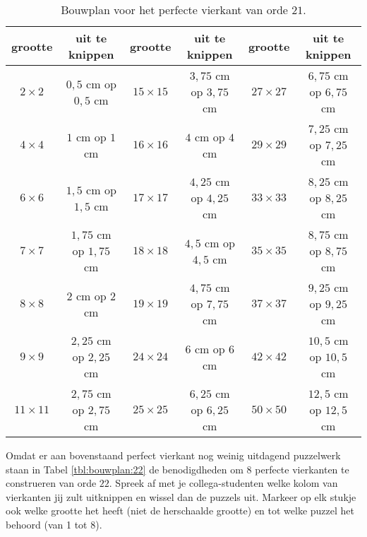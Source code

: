 \documentclass[10pt]{article}
\begin{document}
\begin{table}[ht]
  \centering
  \begin{tabular}{c|c||c|c||c|c}
    grootte & uit te knippen & grootte & uit te knippen & grootte & uit te knippen\\
    \hline
    $2\times 2$ & $0,5$ cm op $0,5$ cm & $15\times 15$ & $3,75$ cm op $3,75$ cm & $27\times 27$ & $6,75$ cm op $6,75$ cm\\
    $4\times 4$ & $1$ cm op $1$ cm & $16\times 16$ & $4$ cm op $4$ cm & $29\times 29$ & $7,25$ cm op $7,25$ cm\\
    $6\times 6$ & $1,5$ cm op $1,5$ cm & $17\times 17$ & $4,25$ cm op $4,25$ cm & $33\times 33$ & $8,25$ cm op $8,25$ cm\\
    $7\times 7$ & $1,75$ cm op $1,75$ cm & $18\times 18$ & $4,5$ cm op $4,5$ cm & $35\times 35$ & $8,75$ cm op $8,75$ cm\\
    $8\times 8$ & $2$ cm op $2$ cm & $19\times 19$ & $4,75$ cm op $7,75$ cm & $37\times 37$ & $9,25$ cm op $9,25$ cm\\
    $9\times 9$ & $2,25$ cm op $2,25$ cm & $24\times 24$ & $6$ cm op $6$ cm & $42\times 42$ & $10,5$ cm op $10,5$ cm\\
    $11\times 11$ & $2,75$ cm op $2,75$ cm & $25\times 25$ & $6,25$ cm op $6,25$ cm & $50\times 50$ & $12,5$ cm op $12,5$ cm\\
  \end{tabular}
  \caption{Bouwplan voor het perfecte vierkant van orde $21$.}
  \label{tbl:bouwplan:21}
\end{table}

Omdat er aan bovenstaand perfect vierkant nog weinig uitdagend puzzelwerk staan in Tabel \ref{tbl:bouwplan:22} de benodigdheden om $8$ perfecte vierkanten te construeren van orde $22$. Spreek af met je collega-studenten welke kolom van vierkanten jij zult uitknippen en wissel dan de puzzels uit. Markeer op elk stukje ook welke grootte het heeft (niet de herschaalde grootte) en tot welke puzzel het behoord (van 1 tot 8).
\end{document}
